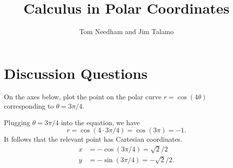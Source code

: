 \documentclass[noauthor,handout]{ximera}
\author{Tom Needham and Jim Talamo}
\title[Collaborate:]{Calculus in Polar Coordinates}
\begin{document}
\begin{abstract}
\end{abstract}
\maketitle

\section{Discussion Questions}

\begin{problem}

On the axes below, plot the point on the polar curve $r = \cos (4 \theta)$ corresponding to $\theta = 3\pi/4$. 

\begin{image}  
\end{image} 


\begin{freeResponse}
Plugging $\theta = 3\pi/4$ into the equation, we have
$$
r = \cos (4 \cdot 3 \pi/4)  = \cos (3\pi) = -1. 
$$
It follows that the relevant point has Cartesian coordinates.
\begin{align*}
x &= -\cos(3 \pi /4) = \sqrt{2}/2 \\
y &= -\sin(3 \pi/4) = - \sqrt{2}/2.
\end{align*}
\end{freeResponse}
\end{problem}
\end{document}
